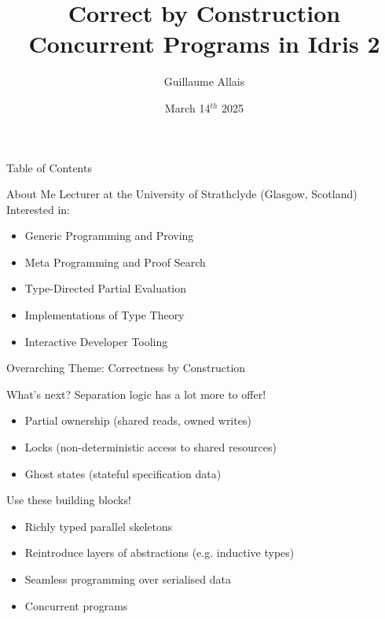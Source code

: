 \documentclass[3to2]{beamer}
\title{Correct by Construction Concurrent Programs \newline in Idris 2}
\author{Guillaume Allais}
\institute{University of Strathclyde \\ Glasgow, UK}
\date{March 14$^{th}$ 2025}
\newcommand{\bobhead}{\texttt{[image: assets/bob.png]}}
\begin{document}
\begin{frame}
  \maketitle
{}
\end{frame}

\begin{frame}{Table of Contents}
  \tableofcontents
\end{frame}

{
\begin{frame}{About Me}
  Lecturer at the University of Strathclyde (Glasgow, Scotland)
  \vfill
  Interested in:
  \begin{itemize}
    \item Generic Programming and Proving
    \item Meta Programming and Proof Search
    \item Type-Directed Partial Evaluation
    \item Implementations of Type Theory
    \item Interactive Developer Tooling
  \end{itemize}
  \vfill
  Overarching Theme: Correctness by Construction
\end{frame}}






\begin{frame}{What's next?}
Separation logic has a lot more to offer!

  \begin{itemize}
    \item Partial ownership (shared reads, owned writes)
    \item Locks (non-deterministic access to shared resources)
    \item Ghost states (stateful specification data)
  \end{itemize}

\vfill

Use these building blocks!

  \begin{itemize}
    \item Richly typed parallel skeletons
    \item Reintroduce layers of abstractions (e.g. inductive types)
    \item Seamless programming over serialised data
    \item Concurrent programs
  \end{itemize}
\end{frame}
\end{document}
